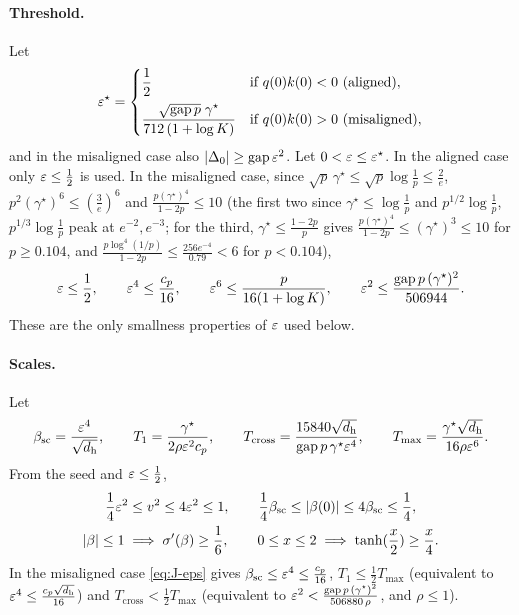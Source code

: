 \paragraph{Threshold.} Let
\[
 \initscale^\star=\begin{cases}\dfrac{1}{2}&\text{if }q(0)k(0)<0\ \text{(aligned)},\\[8pt]
 \dfrac{\sqrt{\mathrm{gap}\,p}\;\gamma^\star}{712\,(1+\log K)}&\text{if }q(0)k(0)>0\ \text{(misaligned)},\end{cases}
\]
and in the misaligned case also $|\Delta_0|\ge\mathrm{gap}\,\varepsilon^2$. Let $0<\varepsilon\le\varepsilon^\star$. In the aligned case only $\varepsilon\le\frac{1}{2}$ is used.
In the misaligned case, since $\sqrt p\,\gamma^\star\le\sqrt p\log\frac{1}{p}\le\frac{2}{e}$, $p^2(\gamma^\star)^6\le(\frac{3}{e})^6$ and $\frac{p(\gamma^\star)^4}{1-2p}\le10$
(the first two since $\gamma^\star\le\log\frac1p$ and $p^{1/2}\log\frac1p$, $p^{1/3}\log\frac1p$ peak at $e^{-2},e^{-3}$; for the third,
$\gamma^\star\le\frac{1-2p}{p}$ gives $\frac{p(\gamma^\star)^4}{1-2p}\le(\gamma^\star)^3\le10$ for $p\ge0.104$, and $\frac{p\log^4(1/p)}{1-2p}\le\frac{256e^{-4}}{0.79}<6$ for $p<0.104$),
\begin{equation}
 \varepsilon\le\frac{1}{2},\qquad \varepsilon^4\le\frac{c_p}{16},\qquad \varepsilon^6\le\frac{p}{16(1+\log K)},\qquad
 \varepsilon^2\le\frac{\mathrm{gap}\,p\,(\gamma^\star)^2}{506944}.
 \label{eq:J-eps}
\end{equation}
These are the only smallness properties of $\varepsilon$ used below.

\paragraph{Scales.} Let
\[
 \beta_{\mathrm{sc}}=\frac{\varepsilon^4}{\sqrt{d_{\mathrm h}}},\qquad T_1=\frac{\gamma^\star}{2\rho\varepsilon^2c_p},\qquad
 T_{\mathrm{cross}}=\frac{15840\sqrt{d_{\mathrm h}}}{\mathrm{gap}\,p\,\gamma^\star\varepsilon^4},\qquad T_{\max}=\frac{\gamma^\star\sqrt{d_{\mathrm h}}}{16\rho\varepsilon^6}.
\]
From the seed and $\varepsilon\le\frac{1}{2}$,
\begin{equation}
 \begin{gathered}
 \tfrac{1}{4}\initscale^2\le v^2\le4\initscale^2\le1,\qquad \tfrac{1}{4}\beta_{\mathrm{sc}}\le|\beta(0)|\le4\beta_{\mathrm{sc}}\le\tfrac{1}{4},\\
 |\beta|\le1\implies\sigma'(\beta)\ge\tfrac{1}{6},\qquad 0\le x\le2\implies\tanh(\tfrac{x}{2})\ge\tfrac{x}{4} .
 \end{gathered}
 \label{eq:J-scales}
\end{equation}
In the misaligned case \cref{eq:J-eps} gives $\beta_{\mathrm{sc}}\le\varepsilon^4\le\frac{c_p}{16}$, $T_1\le\frac{1}{2}T_{\max}$ (equivalent to $\varepsilon^4\le\frac{c_p\sqrt{d_{\mathrm h}}}{16}$) and
$T_{\mathrm{cross}}<\frac{1}{2}T_{\max}$ (equivalent to $\varepsilon^2<\frac{\mathrm{gap}\,p\,(\gamma^\star)^2}{506880\,\rho}$, and $\rho\le1$).

